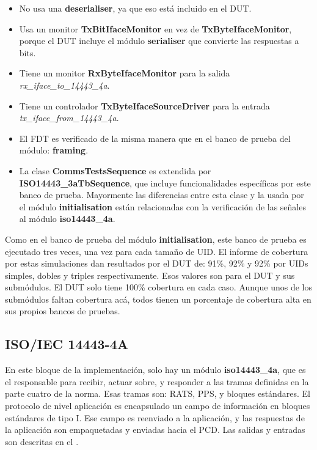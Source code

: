 \documentclass[a4paper, twoside, 11pt]{report}
\begin{document}
\begin{itemize}
  \item No usa una \textbf{deserialiser}, ya que eso está incluido en el DUT.
  \item Usa un monitor \textbf{TxBitIfaceMonitor} en vez de \textbf{TxByteIfaceMonitor}, porque el DUT incluye el módulo \textbf{serialiser} que convierte las respuestas a bits.
  \item Tiene un monitor \textbf{RxByteIfaceMonitor} para la salida \textit{rx\_iface\_to\_14443\_4a}.
  \item Tiene un controlador \textbf{TxByteIfaceSourceDriver} para la entrada \textit{tx\_iface\_from\_14443\_4a}.
  \item El FDT es verificado de la misma manera que en el banco de prueba del módulo: \textbf{framing}.
  \item La clase \textbf{CommsTestsSequence} es extendida por \textbf{ISO14443\_3aTbSequence}, que incluye funcionalidades específicas por este banco de prueba. Mayormente las diferencias entre esta clase y la usada por el módulo \textbf{initialisation} están relacionadas con la verificación de las señales al módulo \textbf{iso14443\_4a}.
\end{itemize}

Como en el banco de prueba del módulo \textbf{initialisation}, este banco de prueba es ejecutado tres veces, una vez para cada tamaño de UID. El informe de cobertura por estas simulaciones dan resultados por el DUT de: 91\%, 92\% y 92\% por UIDs simples, dobles y triples respectivamente. Esos valores son para el DUT y sus submódulos. El DUT solo tiene 100\% cobertura en cada caso. Aunque unos de los submódulos faltan cobertura acá, todos tienen un porcentaje de cobertura alta en sus propios bancos de pruebas.

\FloatBarrier
\subsection{ISO/IEC 14443-4A}

En este bloque de la implementación, solo hay un módulo \textbf{iso14443\_4a}, que es el responsable para recibir, actuar sobre, y responder a las tramas definidas en la parte cuatro de la norma. Esas tramas son: RATS, PPS, y bloques estándares. El protocolo de nivel aplicación es encapsulado un campo de información en bloques estándares de tipo I. Ese campo es reenviado a la aplicación, y las respuestas de la aplicación son empaquetadas y enviadas hacia el PCD. Las salidas y entradas son descritas en el .
\end{document}
